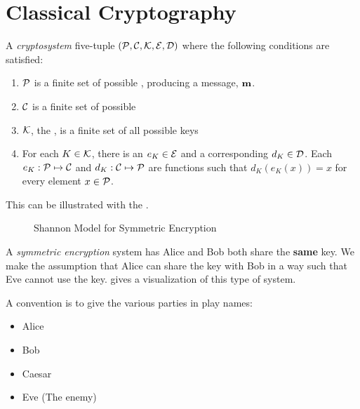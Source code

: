 \section{Classical Cryptography}\label{sec:Classical_Cryptography}
\begin{definition}[Cryptosystem]\label{def:Cryptosystem}
  A \emph{cryptosystem} five-tuple $(\operatorname{\mathcal{P}}, \operatorname{\mathcal{C}}, \operatorname{\mathcal{K}}, \operatorname{\mathcal{E}}, \operatorname{\mathcal{D}})$ where the following conditions are satisfied:
  \begin{enumerate}[noitemsep]
  \item $\operatorname{\mathcal{P}}$ is a finite set of possible \emph{}, producing a message, $\operatorname{\mathbf{m}}$.
  \item $\operatorname{\mathcal{C}}$ is a finite set of possible \emph{}
  \item $\operatorname{\mathcal{K}}$, the \emph{}, is a finite set of all possible keys
  \item For each $K \in \operatorname{\mathcal{K}}$, there is an \emph{} $e_{K}\in \operatorname{\mathcal{E}}$ and a corresponding \emph{} $d_{K} \in \operatorname{\mathcal{D}}$.
    Each $e_{K} : \operatorname{\mathcal{P}} \mapsto \operatorname{\mathcal{C}}$ and $d_{K} : \operatorname{\mathcal{C}} \mapsto \operatorname{\mathcal{P}}$ are functions such that $d_{K} \left( e_{K}(x) \right) = x$ for every  element $x \in \operatorname{\mathcal{P}}$.
  \end{enumerate}
\end{definition}

This can be illustrated with the .

\begin{figure}[h!]
  \centering
  \caption{Shannon Model for Symmetric Encryption}
  \label{fig:Shannon_Model_Symmetric_Encryption}
\end{figure}

\begin{definition}\label{def:Symmetric_Encryption}
  A \emph{symmetric encryption} system has Alice and Bob both share the \textbf{same} key.
  We make the assumption that Alice can share the key with Bob in a way such that Eve cannot use the key.
   gives a visualization of this type of system.
\end{definition}

A convention is to give the various parties in play names:
\begin{itemize}[noitemsep]
\item Alice
\item Bob
\item Caesar
\item Eve (The enemy)
\end{itemize}

